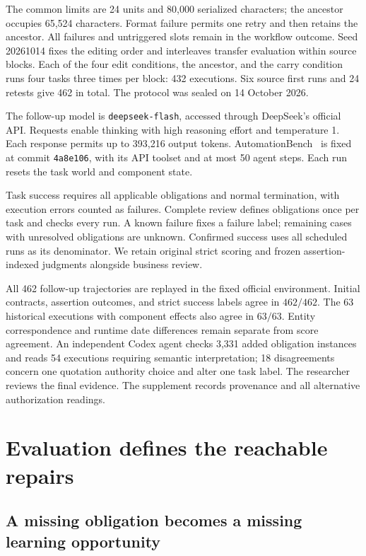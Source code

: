 \documentclass{ecai}
\begin{document}
The common limits are 24 units and 80,000 serialized characters; the ancestor occupies 65,524 characters. Format failure permits one retry and then retains the ancestor. All failures and untriggered slots remain in the workflow outcome. Seed 20261014 fixes the editing order and interleaves transfer evaluation within source blocks. Each of the four edit conditions, the ancestor, and the carry condition runs four tasks three times per block: 432 executions. Six source first runs and 24 retests give 462 in total. The protocol was sealed on 14 October 2026.

The follow-up model is \texttt{deepseek-flash}, accessed through DeepSeek's official API. Requests enable thinking with high reasoning effort and temperature 1. Each response permits up to 393,216 output tokens. AutomationBench~\cite{automationbench} is fixed at commit \texttt{4a8e106}, with its API toolset and at most 50 agent steps. Each run resets the task world and component state.

Task success requires all applicable obligations and normal termination, with execution errors counted as failures. Complete review defines obligations once per task and checks every run. A known failure fixes a failure label; remaining cases with unresolved obligations are unknown. Confirmed success uses all scheduled runs as its denominator. We retain original strict scoring and frozen assertion-indexed judgments alongside business review.

All 462 follow-up trajectories are replayed in the fixed official environment. Initial contracts, assertion outcomes, and strict success labels agree in $462/462$. The 63 historical executions with component effects also agree in $63/63$. Entity correspondence and runtime date differences remain separate from score agreement. An independent Codex agent checks 3,331 added obligation instances and reads 54 executions requiring semantic interpretation; 18 disagreements concern one quotation authority choice and alter one task label. The researcher reviews the final evidence. The supplement records provenance and all alternative authorization readings.

\section{Evaluation defines the reachable repairs}
\label{sec:selection}

\subsection{A missing obligation becomes a missing learning opportunity}
\end{document}
